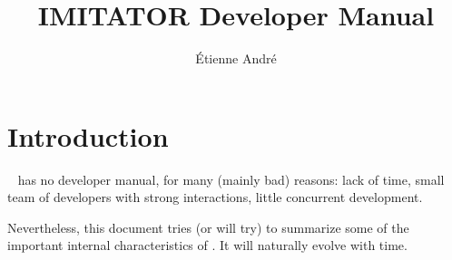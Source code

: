 



\title{IMITATOR Developer Manual}
\author{Étienne André}

\newcommand{\titleOnFirstPage}{IMITATOR \emph{not} a Developer Manual}





\sloppy







\chapter{Introduction}

\imitator{}~\cite{AFKS12} has no developer manual, for many (mainly bad) reasons:
lack of time, small team of developers with strong interactions, little concurrent development.

Nevertheless, this document tries (or will try) to summarize some of the important internal characteristics of \imitator{}.
It will naturally evolve with time.


